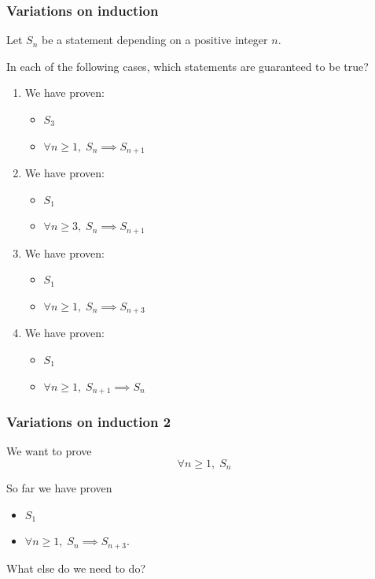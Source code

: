 \documentclass[14pt]{beamer}
\begin{document}
\begin{frame}
	\frametitle{Variations on induction}

	Let $S_{n}$ be a statement depending on a positive integer $n$.

	\vfill

	In each of the following cases, which statements are guaranteed to be true?

	\vfill

	\begin{multicols}{2}
		\begin{enumerate}
			\item We have proven:
				\begin{itemize}
					\item $S_{3}$

					\item $\displaystyle \forall n \geq 1, \; S_{n}\implies S_{n+1}$
				\end{itemize}

			\item We have proven:
				\begin{itemize}
					\item $S_{1}$

					\item $\displaystyle \forall n \geq 3, \; S_{n}\implies S_{n+1}$
				\end{itemize}

			\item We have proven:
				\begin{itemize}
					\item $S_{1}$

					\item $\displaystyle \forall n \geq 1, \; S_{n}\implies S_{n+3}$
				\end{itemize}

			\item We have proven:
				\begin{itemize}
					\item $S_{1}$

					\item $\displaystyle \forall n \geq 1, \; S_{n+1}\implies S_{n}$
				\end{itemize}
		\end{enumerate}
	\end{multicols}

	\vfill
\end{frame}

\begin{frame}
	\frametitle{Variations on induction 2}

	We want to prove
	\[
		\forall n \geq 1, \; S_{n}
	\]

	\vfill

	So far we have proven
	\begin{itemize}
		\item $S_{1}$

		\item $\displaystyle \forall n \geq 1, \; S_{n}\implies S_{n+3}.$
	\end{itemize}

	\vfill

	What else do we need to do?
\end{frame}
\end{document}
